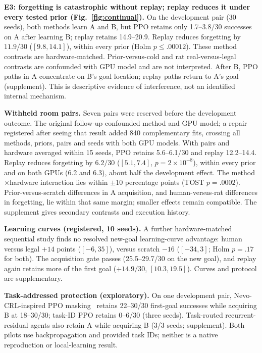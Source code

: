 \documentclass[10pt,onecolumn,letterpaper]{article}
\begin{document}
\textbf{E3: forgetting is catastrophic without replay; replay reduces it under every tested prior (Fig.~\ref{fig:continual}).}
On the development pair (30 seeds), both methods learn A and B, but PPO retains only 1.7--3.8/30 successes
on A after learning B; replay retains 14.9--20.9. Replay reduces forgetting by $11.9/30$ ($[9.8,14.1]$), within
every prior (Holm $p\leq.00012$). These method contrasts are hardware-matched. Prior-versus-cold and rat
real-versus-legal contrasts are confounded with GPU model and are not interpreted.
After B, PPO paths in A concentrate on B's goal location; replay paths return to A's goal
(supplement). This is descriptive evidence of interference, not an identified internal mechanism.

\textbf{Withheld room pairs.} Seven pairs were reserved before the development outcome. The original follow-up
confounded method and GPU model; a repair registered after seeing that result added 840 complementary fits, crossing
all methods, priors, pairs and seeds with both GPU models. With pairs and hardware averaged within 15 seeds,
PPO retains 5.6--6.1/30 and replay 12.2--14.4. Replay reduces forgetting by $6.2/30$ ($[5.1,7.4]$, $p=2\times10^{-8}$),
within every prior and on both GPUs (6.2 and 6.3), about half the development effect. The method$\times$hardware
interaction lies within $\pm$10 percentage points (TOST $p=.0002$).
Prior-versus-scratch differences in A acquisition, and human-versus-rat differences in forgetting, lie within that
same margin; smaller effects remain compatible. The supplement gives secondary contrasts and execution history.


\textbf{Learning curves (registered, 10 seeds).} A further hardware-matched sequential study finds no resolved
new-goal learning-curve advantage: human versus legal $+14$ points ($[-6,35]$), versus scratch $-16$
($[-34,3]$; Holm $p=.17$ for both). The acquisition gate passes (25.5--29.7/30 on the new goal), and replay
again retains more of the first goal ($+14.9/30$, $[10.3,19.5]$). Curves and protocol are supplementary.

\textbf{Task-addressed protection (exploratory).} On one development pair, Nevo-CRL-inspired
PPO masking~\cite{li2026nevo} retains 22--30/30 first-goal successes while acquiring B at 18--30/30;
task-ID PPO retains 0--6/30 (three seeds). Task-routed recurrent-residual agents also retain A while acquiring B (3/3 seeds; supplement). Both pilots use backpropagation and provided task IDs; neither is a native reproduction or
local-learning result.
\end{document}
